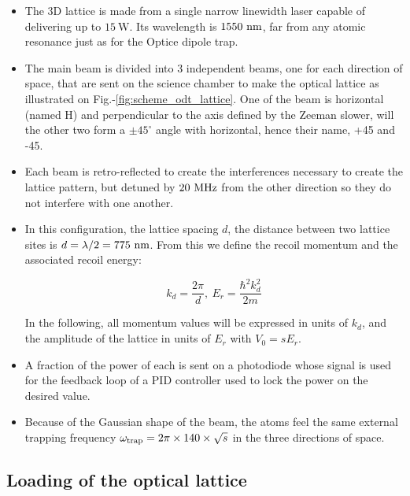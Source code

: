 \begin{itemize}
    \item The 3D lattice is made from a single narrow linewidth laser capable of delivering up to $15 \ \mathrm{W}$. Its wavelength is $1550 \ \rm{nm}$, \ie far from any atomic resonance just as for the Optice dipole trap.
    \item  The main beam is divided into 3 independent beams, one for each direction of space, that are sent on the science chamber to make the optical lattice as illustrated on Fig.-\ref{fig:scheme_odt_lattice}. One of the beam is horizontal (named H) and perpendicular to the axis defined by the Zeeman slower, will the other two form a $\pm 45^{\circ}$ angle with horizontal, hence their name, +45 and -45.
    \item  Each beam is retro-reflected to create the interferences necessary to create the lattice pattern, but detuned by $20 \ \rm{MHz}$ from the other direction so they do not interfere with one another.
    \item In this configuration, the lattice spacing $d$, \ie the distance between two lattice sites is $d=\lambda/2 = 775 \ \rm{nm}$. From this we define the recoil momentum and the associated recoil energy:
    
    \begin{equation}
        k_d = \frac{2 \pi}{d}, \ E_r = \frac{\hbar^2 k_d^2}{2 m}
    \end{equation}
    
    \noindent In the following, all momentum values will be expressed in units of $k_d$, and the amplitude of the lattice in units of $E_r$ with $V_0 =  s E_r$.
    
    \item A fraction of the power of each is sent on a photodiode whose signal is used for the feedback loop of a PID controller used to lock the power on the desired value.
    
    \item Because of the Gaussian shape of the beam, the atoms feel the same external trapping frequency $\omega_{\rm{trap}} = 2 \pi \times 140 \times \sqrt{s}$ in the three directions of space.  
    
\end{itemize}

\subsection{Loading of the optical lattice}

